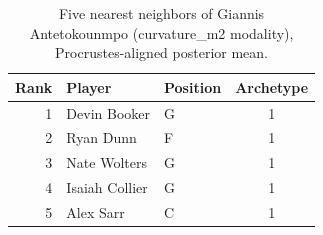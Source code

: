 \begin{table}[htbp]
  \centering\small
  \begin{tabular}{rllc}
    \toprule
    Rank & Player & Position & Archetype \\
    \midrule
    1 & Devin Booker & G & 1 \\
    2 & Ryan Dunn & F & 1 \\
    3 & Nate Wolters & G & 1 \\
    4 & Isaiah Collier & G & 1 \\
    5 & Alex Sarr & C & 1 \\
    \bottomrule
  \end{tabular}
  \caption{Five nearest neighbors of Giannis Antetokounmpo (curvature_m2 modality), Procrustes-aligned posterior mean.}
  \label{tab:Giannis_Antetokounmpo_neighbors_curvature_m2}
\end{table}

